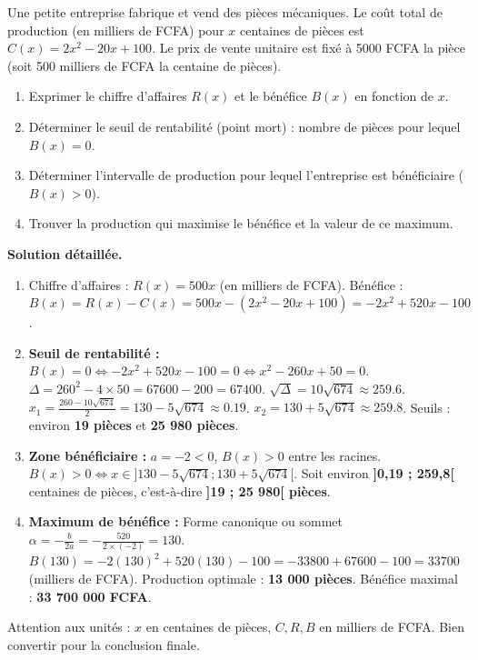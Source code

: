 \documentclass[11pt]{article}
\begin{document}
\begin{exoresolu}
    Une petite entreprise fabrique et vend des pièces mécaniques. Le coût total de production (en milliers de FCFA) pour $x$ centaines de pièces est $C(x) = 2x^2 - 20x + 100$. Le prix de vente unitaire est fixé à \num{5000} FCFA la pièce (soit \num{500} milliers de FCFA la centaine de pièces).
    \begin{enumerate}
        \item Exprimer le chiffre d'affaires $R(x)$ et le bénéfice $B(x)$ en fonction de $x$.
        \item Déterminer le seuil de rentabilité (point mort) : nombre de pièces pour lequel $B(x)=0$.
        \item Déterminer l'intervalle de production pour lequel l'entreprise est bénéficiaire ($B(x) > 0$).
        \item Trouver la production qui maximise le bénéfice et la valeur de ce maximum.
    \end{enumerate}
    \tcblower
    \textbf{Solution détaillée.}
    \begin{enumerate}
        \item Chiffre d'affaires : $R(x) = \num{500}x$ (en milliers de FCFA).
        Bénéfice : $B(x) = R(x) - C(x) = 500x - (2x^2 - 20x + 100) = -2x^2 + 520x - 100$.
        \item \textbf{Seuil de rentabilité :} $B(x) = 0 \Leftrightarrow -2x^2 + 520x - 100 = 0 \Leftrightarrow x^2 - 260x + 50 = 0$.
        $\Delta = 260^2 - 4\times50 = 67600 - 200 = 67400$. $\sqrt{\Delta} = 10\sqrt{674} \approx \num{259,6}$.
        $x_1 = \frac{260 - 10\sqrt{674}}{2} = 130 - 5\sqrt{674} \approx \num{0,19}$.
        $x_2 = 130 + 5\sqrt{674} \approx \num{259,8}$.
        Seuils : environ \textbf{19 pièces} et \textbf{25 980 pièces}.
        \item \textbf{Zone bénéficiaire :} $a=-2 < 0$, $B(x) > 0$ entre les racines.
        $B(x) > 0 \Leftrightarrow x \in ]130 - 5\sqrt{674} ; 130 + 5\sqrt{674}[$.
        Soit environ \textbf{]0,19 ; 259,8[} centaines de pièces, c'est-à-dire \textbf{]19 ; 25 980[ pièces}.
        \item \textbf{Maximum de bénéfice :} Forme canonique ou sommet $\alpha = -\frac{b}{2a} = -\frac{520}{2\times(-2)} = 130$.
        $B(130) = -2(130)^2 + 520(130) - 100 = -33800 + 67600 - 100 = \num{33700}$ (milliers de FCFA).
        Production optimale : \textbf{13 000 pièces}. Bénéfice maximal : \textbf{33 700 000 FCFA}.
    \end{enumerate}
    \begin{attention}[Unités] Attention aux unités : $x$ en centaines de pièces, $C, R, B$ en milliers de FCFA. Bien convertir pour la conclusion finale.
    \end{attention}
\end{exoresolu}
\end{document}

